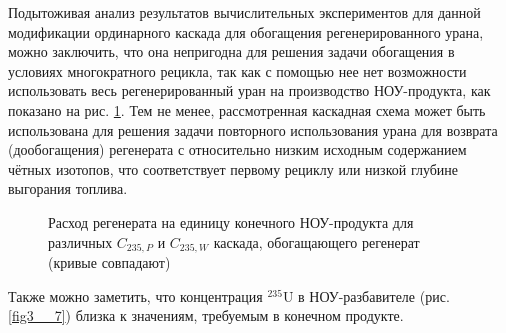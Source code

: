 Подытоживая анализ результатов вычислительных экспериментов для данной модификации ординарного каскада для обогащения регенерированного урана, можно заключить, что она непригодна для решения задачи обогащения в условиях многократного рецикла, так как с помощью нее нет возможности использовать весь регенерированный уран на производство НОУ-продукта, как показано на рис. \ref{Figure_10}. Тем не менее, рассмотренная каскадная схема может быть использована для решения задачи повторного использования урана для возврата (дообогащения) регенерата с относительно низким исходным содержанием чётных изотопов, что соответствует первому рециклу или низкой глубине выгорания топлива.


\begin{figure}[ht]
  \caption{Расход регенерата на единицу конечного НОУ-продукта для различных  $C_{235, P}$ и $C_{235, W}$ каскада, обогащающего регенерат (кривые совпадают)}\label{Figure_10}
\end{figure}

Также можно заметить, что концентрация $^{235}$U в НОУ-разбавителе (рис. \ref{fig3__7}) близка к значениям, требуемым в конечном продукте.


